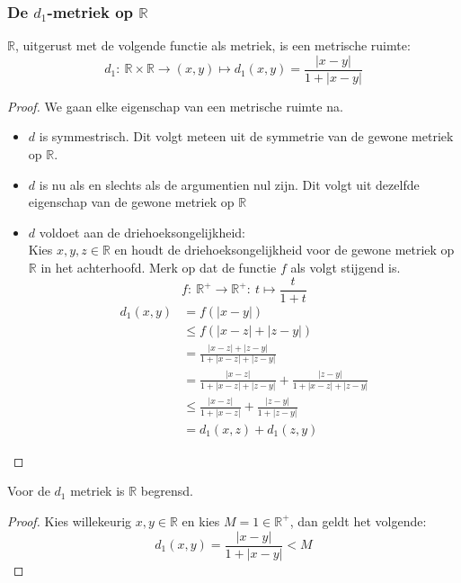 \documentclass[main.tex]{subfiles}
\begin{document}
\subsubsection{De $d_1$-metriek op $\mathbb{R}$}
\label{sec:d_1-metriek-op}

\begin{vb}
  $\mathbb{R}$, uitgerust met de volgende functie als metriek, is een metrische ruimte:
  \[ d_{1}:\ \mathbb{R}\times\mathbb{R}\rightarrow (x,y) \mapsto d_{1}(x,y)=\frac{|x-y|}{1+|x-y|} \]
  \begin{proof}
    We gaan elke eigenschap van een metrische ruimte na.
    \begin{itemize}
    \item $d$ is symmestrisch.
      Dit volgt meteen uit de symmetrie van de gewone metriek op $\mathbb{R}$.
    \item $d$ is nu als en slechts als de argumentien nul zijn.
      Dit volgt uit dezelfde eigenschap van de gewone metriek op $\mathbb{R}$
    \item $d$ voldoet aan de driehoeksongelijkheid:\\
      Kies $x,y,z \in \mathbb{R}$ en houdt de driehoeksongelijkheid voor de gewone metriek op $\mathbb{R}$ in het achterhoofd.
      Merk op dat de functie $f$ als volgt stijgend is.
      \[ f:\ \mathbb{R}^{+} \rightarrow \mathbb{R}^{+}:\ t \mapsto \frac{t}{1+t} \]
      \begin{align*}
        d_{1}(x,y)
        &= f(|x-y|)\\
        &\le f(|x-z|+|z-y|)\\
        &= \frac{|x-z|+|z-y|}{1+|x-z|+|z-y|}\\
        &= \frac{|x-z|}{1+|x-z|+|z-y|}+\frac{|z-y|}{1+|x-z|+|z-y|}\\
        &\le \frac{|x-z|}{1+|x-z|}+\frac{|z-y|}{1+|z-y|}\\
        &= d_{1}(x,z) + d_{1}(z,y)
      \end{align*}
    \end{itemize}
  \end{proof}
\end{vb}

\begin{st}
  Voor de $d_{1}$ metriek is $\mathbb{R}$ begrensd.
  \begin{proof}
    Kies willekeurig $x,y\in\mathbb{R}$ en kies $M=1\in \mathbb{R}^{+}$, dan geldt het volgende:
    \[ d_{1}(x,y) = \frac{|x-y|}{1+|x-y|} < M \]
  \end{proof}
\end{st}
\end{document}
